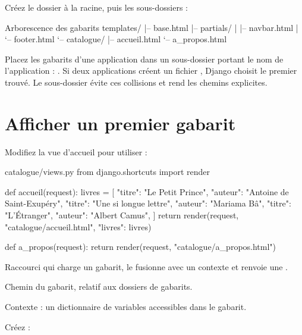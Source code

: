 Créez le dossier  à la racine, puis les sous-dossiers :

\begin{codebox}[tree]{Arborescence des gabarits}
templates/
|-- base.html
|-- partials/
|   |-- navbar.html
|   `-- footer.html
`-- catalogue/
    |-- accueil.html
    `-- a_propos.html
\end{codebox}

\begin{bonne}
Placez les gabarits d'une application dans un sous-dossier portant le nom de
l'application : . Si deux applications
créent un fichier , Django choisit le premier trouvé. Le
sous-dossier évite ces collisions et rend les chemins explicites.
\end{bonne}

\section{Afficher un premier gabarit}

Modifiez la vue d'accueil pour utiliser  :

\begin{codebox}[python]{catalogue/views.py}
from django.shortcuts import render


def accueil(request):
    livres = [
        {"titre": "Le Petit Prince", "auteur": "Antoine de Saint-Exupéry"},
        {"titre": "Une si longue lettre", "auteur": "Mariama Bâ"},
        {"titre": "L'Étranger", "auteur": "Albert Camus"},
    ]
    return render(request, "catalogue/accueil.html", {"livres": livres})


def a_propos(request):
    return render(request, "catalogue/a_propos.html")
\end{codebox}

\begin{description}[leftmargin=2.8cm,style=nextline]
  \item[\code{render}] Raccourci qui charge un gabarit, le fusionne avec un
  contexte et renvoie une .
  \item[\code{"catalogue/accueil.html"}] Chemin du gabarit, relatif aux dossiers
  de gabarits.
  \item[\code{\{"livres": livres\}}] Contexte : un dictionnaire de variables
  accessibles dans le gabarit.
\end{description}

Créez  :

